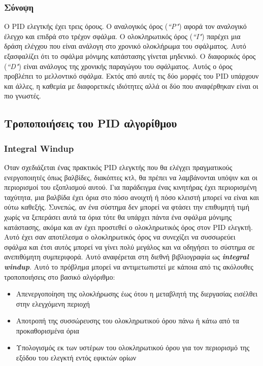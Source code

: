 \subsubsection{Σύνοψη}
Ο PID ελεγτκής έχει τρεις όρους. Ο αναλογικός όρος (\emph{``P"}) αφορά τον αναλογικό έλεγχο και επιδρά στο τρέχον σφάλμα. Ο ολοκληρωτικός όρος (\emph{``I"}) παρέχει μια δράση ελέγχου που είναι ανάλογη στο χρονικό ολοκλήρωμα του σφάλματος. Αυτό εξασφαλίζει ότι το σφάλμα μόνιμης κατάστασης γίνεται μηδενικό. Ο διαφορικός όρος (\emph{``D"}) είναι ανάλογος της χρονικής παραγώγου του σφάλματος. Αυτός ο όρος προβλέπει το μελλοντικό σφάλμα. Εκτός από αυτές τις δύο μορφές του PID υπάρχουν και άλλες, η καθεμία με διαφορετικές ιδιότητες αλλά οι δύο που αναφέρθηκαν είναι οι πιο γνωστές.

\subsection{Τροποποιήσεις του PID αλγορίθμου} \label{subsec:pid_modifications}

\subsubsection{Integral Windup}
Όταν σχεδιάζεται ένας πρακτικός PID ελεγκτής που θα ελέγχει πραγματικούς ενεργοποιητές όπως βαλβίδες, διακόπτες κτλ, θα πρέπει να λαμβάνονται υπόψιν και οι περιορισμοί του εξοπλισμού αυτού. Για παράδειγμα ένας κινητήρας έχει περιορισμένη ταχύτητα, μια βαλβίδα έχει όρια στο πόσο ανοιχτή ή πόσο κλειστή μπορεί να είναι και ούτω καθεξής. Συνεπώς, αν ένα σύστημα δεν μπορεί να φτάσει την επιθυμητή τιμή χωρίς να ξεπεράσει αυτά τα όρια τότε θα υπάρχει πάντα ένα σφάλμα μόνιμης κατάστασης, ακόμα και αν έχει προστεθεί ο ολοκληρωτικός όρος στον PID ελεγκτή. Αυτό έχει σαν αποτέλεσμα ο ολοκληρωτικός όρος να συνεχίζει να συσσωρεύει σφάλμα και έτσι αυτός μπορεί να γίνει πολύ μεγάλος και να οδηγήσει το σύστημα σε ανεπιθύμητη συμπεριφορά. Αυτό αναφέρεται στη διεθνή βιβλιογραφία ως \textbf{\emph{integral windup}}. Αυτό το πρόβλημα μπορεί να αντιμετωπιστεί με κάποια από τις ακόλουθες τροποποιήσεις στο βασικό αλγόριθμο:
\begin{itemize}
\item Απενεργοποίηση της ολοκλήρωσης έως ότου η μεταβλητή της διεργασίας εισέλθει στην ελεγχόμενη περιοχή
\item Αποτροπή της συσσώρευσης του ολοκληρωτικού όρου πάνω ή κάτω από τα προκαθορισμένα όρια
\item Υπολογισμός εκ των υστέρων του ολοκληρωτικού όρου για τον περιορισμό της εξόδου του ελεγκτή εντός εφικτών ορίων
\end{itemize}

